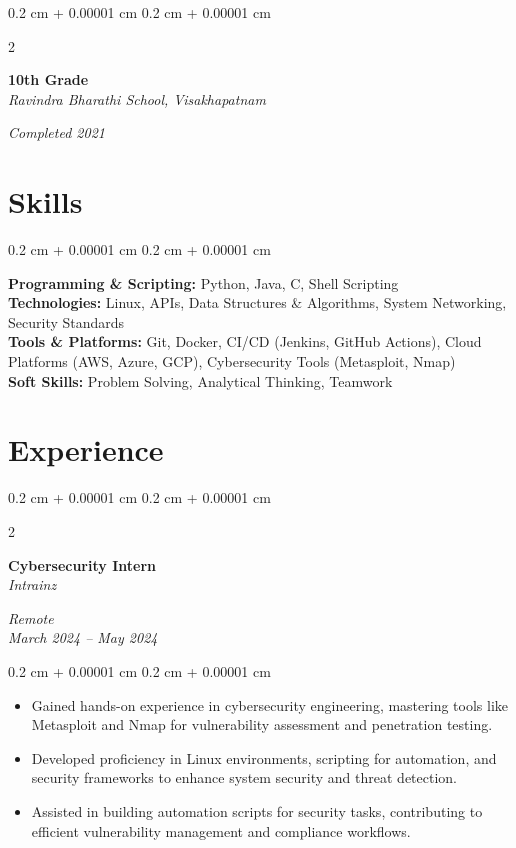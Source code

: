 \documentclass[10pt, letterpaper]{article}
\newenvironment{highlights}{
    \begin{itemize}[
        topsep=0.10 cm,
        parsep=0.10 cm,
        partopsep=0pt,
        itemsep=0pt,
        leftmargin=0.4 cm + 10pt
    ]
}{
    \end{itemize}
} %
\newenvironment{onecolentry}{
    \begin{adjustwidth}{
        0.2 cm + 0.00001 cm
    }{
        0.2 cm + 0.00001 cm
    }
}{
    \end{adjustwidth}
} %
\newenvironment{twocolentry}[2][]{
    \onecolentry
    \def\secondColumn{#2}
    \setcolumnwidth{\fill, 4.5 cm}
    \begin{paracol}{2}
}{
    \switchcolumn \raggedleft \secondColumn
    \end{paracol}
    \endonecolentry
} %
\begin{document}
    \vspace{0.10 cm}
    \begin{twocolentry}{
        \textit{Completed 2021}
    }
        \textbf{10th Grade} \\
        \textit{Ravindra Bharathi School, Visakhapatnam}
    \end{twocolentry}

    \section{Skills}
    \begin{onecolentry}
        \textbf{Programming \& Scripting:} Python, Java, C, Shell Scripting \\
        \textbf{Technologies:} Linux, APIs, Data Structures \& Algorithms, System Networking, Security Standards \\
        \textbf{Tools \& Platforms:} Git, Docker, CI/CD (Jenkins, GitHub Actions), Cloud Platforms (AWS, Azure, GCP), Cybersecurity Tools (Metasploit, Nmap) \\
        \textbf{Soft Skills:} Problem Solving, Analytical Thinking, Teamwork
    \end{onecolentry}

    \section{Experience}
    \begin{twocolentry}{
        \textit{Remote} \\
        \textit{March 2024 – May 2024}
    }
        \textbf{Cybersecurity Intern} \\
        \textit{Intrainz}
    \end{twocolentry}
    \vspace{0.10 cm}
    \begin{onecolentry}
        \begin{highlights}
            \item Gained hands-on experience in cybersecurity engineering, mastering tools like Metasploit and Nmap for vulnerability assessment and penetration testing.
            \item Developed proficiency in Linux environments, scripting for automation, and security frameworks to enhance system security and threat detection.
            \item Assisted in building automation scripts for security tasks, contributing to efficient vulnerability management and compliance workflows.
        \end{highlights}
    \end{onecolentry}
\end{document}
